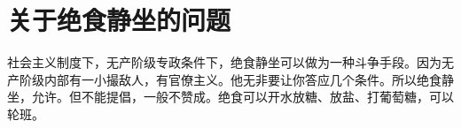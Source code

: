 \section[关于绝食静坐的问题（一九六七年六月二十九日）]{关于绝食静坐的问题}


社会主义制度下，无产阶级专政条件下，绝食静坐可以做为一种斗争手段。因为无产阶级内部有一小撮敌人，有官僚主义。他无非要让你答应几个条件。所以绝食静坐，允许。但不能提倡，一般不赞成。绝食可以开水放糖、放盐、打葡萄糖，可以轮班。


